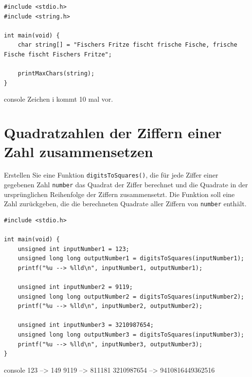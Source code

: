 \Vorlage
\begin{verbatim}
#include <stdio.h>
#include <string.h>

int main(void) {
    char string[] = "Fischers Fritze fischt frische Fische, frische Fische fischt Fischers Fritze";

    printMaxChars(string);
}
\end{verbatim}

\begin{mybox}[Bildschirmausgabe]{console}
Zeichen i kommt 10 mal vor.
\end{mybox}





\chapter{Quadratzahlen der Ziffern einer Zahl zusammensetzen}

\vspace{10pt}

Erstellen Sie eine Funktion \texttt{digitsToSquares()}, die für jede
Ziffer einer gegebenen Zahl \texttt{number} das Quadrat der Ziffer
berechnet und die Quadrate in der ursprünglichen Reihenfolge der Ziffern
zusammensetzt. Die Funktion soll eine Zahl zurückgeben, die die berechneten
Quadrate aller Ziffern von \texttt{number} enthält.

\Vorlage
\begin{verbatim}
#include <stdio.h>

int main(void) {
    unsigned int inputNumber1 = 123;
    unsigned long long outputNumber1 = digitsToSquares(inputNumber1);
    printf("%u --> %lld\n", inputNumber1, outputNumber1);

    unsigned int inputNumber2 = 9119;
    unsigned long long outputNumber2 = digitsToSquares(inputNumber2);
    printf("%u --> %lld\n", inputNumber2, outputNumber2);

    unsigned int inputNumber3 = 3210987654;
    unsigned long long outputNumber3 = digitsToSquares(inputNumber3);
    printf("%u --> %lld\n", inputNumber3, outputNumber3);
}
\end{verbatim}

\begin{mybox}[title=Bildschirmausgabe]{console}
123 --> 149
9119 --> 811181
3210987654 --> 9410816449362516
\end{mybox}




